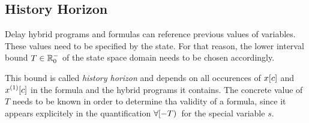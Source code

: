     \subsection{History Horizon}
        \label{sec:history-horizon}

        Delay hybrid programs and \ddL formulas can reference previous values of variables. These values need to be specified by the state.
        For that reason, the lower interval bound $T\in\mathbb{R}^-_0$ of the state space domain needs to be chosen accordingly.

        This bound is called \emph{history horizon} and depends on all occurences of $x[c]$ and $\Dx[c]$ in the formula and the hybrid programs it contains.
        The concrete value of $T$ needs to be known in order to determine tha validity of a formula, since it appears explicitely in the quantification $\forall [-T){\,}$ for the special variable $s$.

